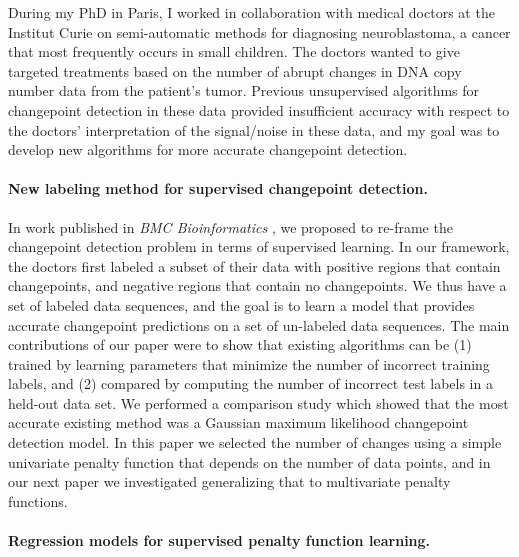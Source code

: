 \documentclass{article}
\begin{document}
During my PhD in Paris, I worked in collaboration with medical doctors
at the Institut Curie on semi-automatic methods for diagnosing
neuroblastoma, a cancer that most frequently occurs in small
children. The doctors wanted to give targeted treatments based on the
number of abrupt changes in DNA copy number data
from the patient's tumor. Previous unsupervised algorithms for
changepoint detection in these data provided insufficient accuracy
with respect to the doctors' interpretation of the signal/noise in
these data, and my goal was to develop new algorithms for more
accurate changepoint detection.

\paragraph{New labeling method for supervised changepoint detection.}

In work published in \emph{BMC Bioinformatics}
\citep{HOCKING-breakpoints}, we proposed to re-frame the changepoint
detection problem in terms of supervised learning. In our framework,
the doctors first labeled a subset of their data with positive regions
that contain changepoints, and negative regions that contain no
changepoints. We thus have a set of labeled data sequences, and the
goal is to learn a model that provides accurate changepoint predictions
on a set of un-labeled data sequences. The main contributions of our
paper were to show that existing algorithms can be (1) trained by
learning parameters that minimize the number of
incorrect training labels, and (2) compared by computing the number of
incorrect test labels in a held-out data set. We performed a
comparison study which showed that the most accurate existing method
was a Gaussian maximum likelihood changepoint detection model. 
In this paper we selected the number of changes using a
simple univariate penalty function that depends on the number of data
points, and in our next paper we investigated generalizing that to
multivariate penalty functions.

\paragraph{Regression models for supervised penalty function
  learning.}
\end{document}
